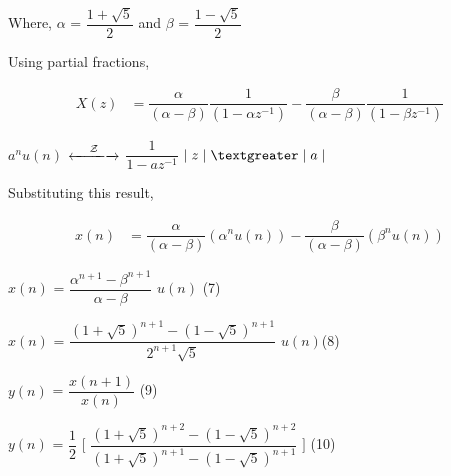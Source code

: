 \documentclass[journal,12pt,twocolumn]{IEEEtran}
\theoremstyle{remark}
\begin{document}
	\vspace{0.3cm}
	
	Where, $\alpha$ = $\dfrac{1 +\sqrt{5}}{2}$ and $\beta$ = $\dfrac{1 -\sqrt{5}}{2}$ 
	
	\vspace{0.4cm}

	Using partial fractions,
	
	\begin{align}
		X(z) &= \dfrac{\alpha}{(\alpha - \beta)} \dfrac{1}{(1 - \alpha z^{-1})} - \dfrac{\beta}{(\alpha - \beta)} \dfrac{1}{(1 - \beta z^{-1})} \tag{5}
	\end{align}
	
	$a^n u(n)$
	$\xleftarrow[]{\hspace{0.4cm}{\mathcal{Z}}\hspace{0.1cm}}\xrightarrow[]{}$
	$\dfrac{1}{1 - a z^{-1}}$ \hspace{0.2cm} $\lvert \hspace{0.1cm} z \hspace{0.1cm}\rvert \hspace{0.1cm} \textgreater \hspace{0.1cm} \lvert \hspace{0.1cm} a \hspace{0.1cm} \rvert$
	
	\vspace{0.4cm}
	
	Substituting this result,
	
	\vspace{-0.5cm}
	
	\begin{align}
		x(n) &= \dfrac{\alpha}{(\alpha - \beta)} (\alpha^n u(n)) - \dfrac{\beta}{(\alpha - \beta)} (\beta^n u(n)) \tag{6}
	\end{align}
	
	$x(n)$ = $\dfrac{\alpha^{n+1} - \beta^{n+1} }{\alpha - \beta}$ $u(n)$ \hfill (7)
	
	\vspace{0.6cm}
	
	$x(n)$ = $\dfrac{(1 + \sqrt{5})^{n+1} - (1 - \sqrt{5})^{n+1} }{2^{n+1} \sqrt{5}}$ $u(n)$\hfill (8)
	
	\vspace{0.6cm}
	
	$y(n)$ = $\dfrac{x(n+1)}{x(n)}$ \hfill (9)
	
	\vspace{0.6cm}
	
	$y(n)$ = $\dfrac{1}{2}$ $\Bigg[$ $\dfrac{(1 + \sqrt{5})^{n+2} - (1 - \sqrt{5})^{n+2}}{(1 + \sqrt{5})^{n+1} - (1 - \sqrt{5})^{n+1}}$ $\Bigg]$ \hfill (10)
	
\end{document}
